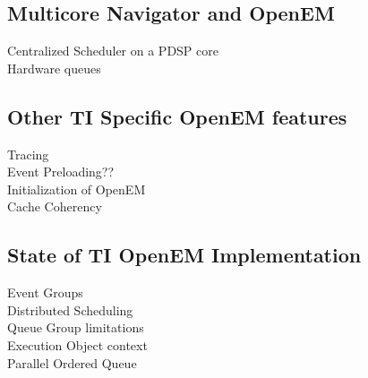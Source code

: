 \subsection{Multicore Navigator and OpenEM}
Centralized Scheduler on a PDSP core\\
Hardware queues\\
\subsection{Other TI Specific OpenEM features}
Tracing\\
Event Preloading??\\
Initialization of OpenEM\\
Cache Coherency
\subsection{State of TI OpenEM Implementation}
Event Groups\\
Distributed Scheduling\\
Queue Group limitations\\
Execution Object context\\
Parallel Ordered Queue\\



